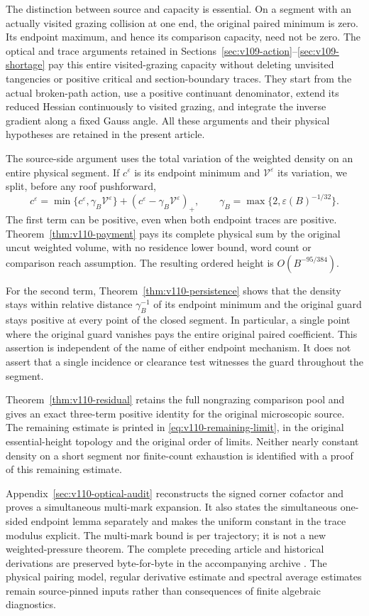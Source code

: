 \documentclass[11pt,reqno]{amsart}
\numberwithin{equation}{section}
\theoremstyle{definition}\newtheorem{definition}[theorem]{Definition}
\theoremstyle{remark}\newtheorem{remark}[theorem]{Remark}
\begin{document}
The distinction between source and capacity is essential. On a
segment with an actually visited grazing collision at one end, the
original paired minimum is zero. Its endpoint maximum, and hence its
comparison capacity, need not be zero. The optical and trace arguments
retained in Sections~\ref{sec:v109-action}--\ref{sec:v109-shortage}
pay this entire visited-grazing capacity without deleting unvisited
tangencies or positive critical and section-boundary traces.
They start from the actual broken-path action, use a positive
continuant denominator, extend its reduced Hessian continuously to
visited grazing, and integrate the inverse gradient along a fixed
Gauss angle. All these arguments and their physical hypotheses are
retained in the present article.

The source-side argument uses the total variation of the
weighted density on an entire physical segment. If $c^\varepsilon$
is its endpoint minimum and $\mathcal V^\varepsilon$ its variation,
we split, before any roof pushforward,
\[
 c^\varepsilon
   =\min\{c^\varepsilon,\gamma_B\mathcal V^\varepsilon\}
       +(c^\varepsilon-\gamma_B\mathcal V^\varepsilon)_+,
 \qquad \gamma_B=\max\{2,\varepsilon(B)^{-1/32}\}.
\]
The first term can be positive, even when both endpoint traces are
positive. Theorem~\ref{thm:v110-payment} pays its complete physical
sum by the original uncut weighted volume, with no residence lower
bound, word count or comparison reach assumption. The resulting
ordered height is $O(B^{-95/384})$.

For the second term, Theorem~\ref{thm:v110-persistence} shows that the
density stays within relative distance $\gamma_B^{-1}$ of its
endpoint minimum and the original guard stays positive at every
point of the closed segment. In particular, a single point where
the original guard vanishes pays the entire original paired
coefficient. This assertion is independent of the name of either
endpoint mechanism. It does not assert that a single incidence or
clearance test witnesses the guard throughout the segment.

Theorem~\ref{thm:v110-residual} retains the full nongrazing comparison
pool and gives an exact three-term positive identity for the
original microscopic source. The remaining estimate is printed in
\eqref{eq:v110-remaining-limit}, in the original essential-height
topology and the original order of limits. Neither nearly constant
density on a short segment nor finite-count exhaustion is identified
with a proof of this remaining estimate.

Appendix~\ref{sec:v110-optical-audit} reconstructs the signed corner
cofactor and proves a simultaneous multi-mark expansion. It also
states the simultaneous one-sided endpoint lemma separately and
makes the uniform constant in the trace modulus explicit. The
multi-mark bound is per trajectory; it is not a new weighted-pressure
theorem. The complete preceding article and historical derivations
are preserved byte-for-byte in the accompanying archive \cite{Q110}.
The physical pairing model, regular derivative estimate and spectral
average estimates remain source-pinned inputs rather than consequences
of finite algebraic diagnostics.
\end{document}
